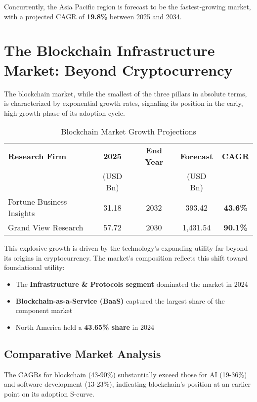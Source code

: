 \documentclass[11pt,a4paper]{report}
\newcommand{\cagr}[1]{\textcolor{sun}{\textbf{#1\%}}}
\begin{document}
Concurrently, the Asia Pacific region is forecast to be the fastest-growing market, with a projected CAGR of \cagr{19.8} between 2025 and 2034.

\section{The Blockchain Infrastructure Market: Beyond Cryptocurrency}

The blockchain market, while the smallest of the three pillars in absolute terms, is characterized by exponential growth rates, signaling its position in the early, high-growth phase of its adoption cycle.
\begin{table}[H]
\centering
\caption{Blockchain Market Growth Projections}
\begin{tabular}{lcccc}
\toprule
\textbf{Research Firm} & \textbf{2025} & \textbf{End Year} & \textbf{Forecast} & \textbf{CAGR} \\
& (USD Bn) & & (USD Bn) & \\
\midrule
Fortune Business Insights & 31.18 & 2032 & 393.42 & \cagr{43.6} \\
Grand View Research & 57.72 & 2030 & 1,431.54 & \cagr{90.1} \\
\bottomrule
\end{tabular}
\end{table}

This explosive growth is driven by the technology's expanding utility far beyond its origins in cryptocurrency. The market's composition reflects this shift toward foundational utility:

\begin{itemize}
    \item The \textbf{Infrastructure \& Protocols segment} dominated the market in 2024
    \item \textbf{Blockchain-as-a-Service (BaaS)} captured the largest share of the component market
    \item North America held a \textbf{43.65\% share} in 2024
\end{itemize}

\subsection{Comparative Market Analysis}

\begin{keypoint}
The CAGRs for blockchain (43-90\%) substantially exceed those for AI (19-36\%) and software development (13-23\%), indicating blockchain's position at an earlier point on its adoption S-curve.
\end{keypoint}
\end{document}
